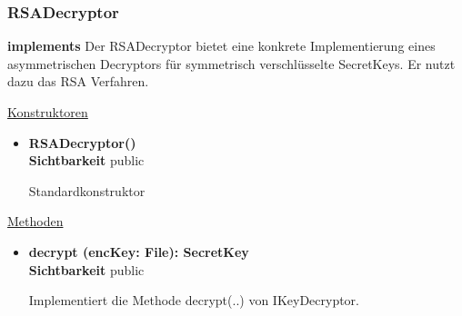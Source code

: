 \subsubsection{RSADecryptor} \label{service:klasse:RSADecryptor}
\textbf{implements}  \newline
Der RSADecryptor bietet eine konkrete Implementierung eines asymmetrischen Decryptors für symmetrisch verschlüsselte SecretKeys. Er nutzt dazu das RSA Verfahren. \newline

\underline{Konstruktoren}
\begin{itemize}
\itemsep0pt
\item \textbf{RSADecryptor()} \hfill\\
\textbf{Sichtbarkeit} public

Standardkonstruktor
\end{itemize}

\underline{Methoden}
\begin{itemize}
\itemsep0pt
\item \textbf{decrypt (encKey: File): SecretKey}\hfill\\
\textbf{Sichtbarkeit} public

Implementiert die Methode decrypt(..) von IKeyDecryptor.

\end{itemize}
